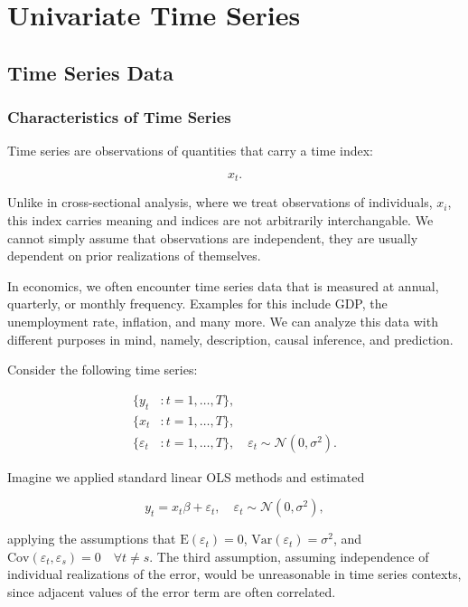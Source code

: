 
\section{Univariate Time Series}

\subsection{Time Series Data}

\subsubsection{Characteristics of Time Series}

Time series are observations of quantities that carry a time index:

\[
	x_t.
\]

Unlike in cross-sectional analysis, where we treat observations of individuals, $x_i$, this index carries meaning and indices are not arbitrarily interchangable. We cannot simply assume that observations are independent, they are usually dependent on prior realizations of themselves. 

In economics, we often encounter time series data that is measured at annual, quarterly, or monthly frequency. Examples for this include GDP, the unemployment rate, inflation, and many more. We can analyze this data with different purposes in mind, namely, description, causal inference, and prediction.

Consider the following time series: 

\begin{align}
	\{y_t&:t=1,\dots, T\}, \\
	\nonumber \{x_t&:t=1,\dots, T\}, \\
	\nonumber \{\varepsilon_t&:t=1,\dots, T\}, \quad \varepsilon_t\sim\mathcal{N}(0,\sigma^2).
\end{align}

Imagine we applied standard linear OLS methods and estimated

\[
	y_t = x_t\beta + \varepsilon_t, \quad \varepsilon_t \sim \mathcal{N}(0,\sigma^2),
\]

applying the assumptions that $\mathrm{E}(\varepsilon_t)=0$, $\mathrm{Var}(\varepsilon_t)=\sigma^2$, and $\mathrm{Cov}(\varepsilon_t,\varepsilon_s)=0 \quad\forall t\neq s$. The third assumption, assuming independence of individual realizations of the error, would be unreasonable in time series contexts, since adjacent values of the error term are often correlated.

